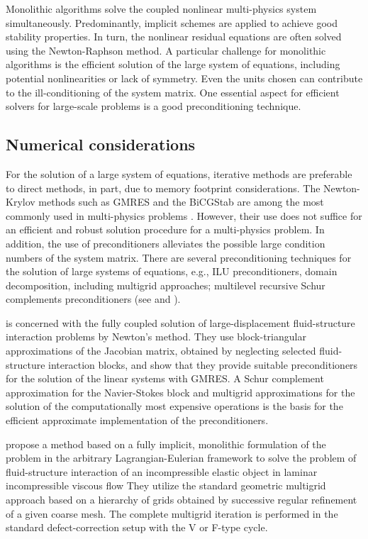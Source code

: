 Monolithic algorithms solve the coupled nonlinear multi-physics system simultaneously.
Predominantly, implicit schemes are applied to achieve good stability properties.
In turn, the nonlinear residual equations are often solved using the Newton-Raphson method.
A particular challenge for monolithic algorithms is the efficient solution of the large system of equations, including potential nonlinearities or lack of symmetry.
Even the units chosen can contribute to the ill-conditioning of the system matrix.
One essential aspect for efficient solvers for large-scale problems is a good preconditioning technique.

\subsection{Numerical considerations}

For the solution of a large system of equations, iterative methods are preferable to direct methods, in part, due to memory footprint considerations.
The Newton-Krylov methods such as GMRES and the BiCGStab are among the most commonly used in multi-physics problems \citep{hron_monolithic_2006}.
However, their use does not suffice for an efficient and robust solution procedure for a multi-physics problem.
In addition, the use of preconditioners alleviates the possible large condition numbers of the system matrix.
There are several preconditioning techniques for the solution of large systems of equations, e.g., ILU preconditioners, domain decomposition, including multigrid approaches; multilevel recursive Schur complements preconditioners (see \cite{smith_domain_2004} and \cite{chen_matrix_2005}).

\cite{heil_efficient_2004} is concerned with the fully coupled solution of large-displacement fluid-structure interaction problems by Newton's method.
They use block-triangular approximations of the Jacobian matrix, obtained by neglecting selected fluid-structure interaction blocks, and show that they provide suitable preconditioners for the solution of the linear systems with GMRES.
A Schur complement approximation for the Navier-Stokes block and multigrid approximations for the solution of the computationally most expensive operations is the basis for the efficient approximate implementation of the preconditioners.

\cite{hron_monolithic_2006} propose a method based on a fully implicit, monolithic formulation of the problem in the arbitrary Lagrangian-Eulerian framework  to solve the problem of fluid-structure interaction of an incompressible elastic object in laminar incompressible viscous flow
They utilize the standard geometric multigrid approach based on a hierarchy of grids obtained by successive regular refinement of a given coarse mesh.
The complete multigrid iteration is performed in the standard defect-correction setup with the V or F-type cycle.

